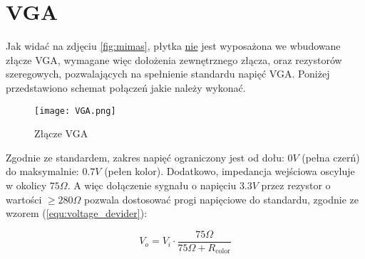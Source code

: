 \section{VGA}
    \tab Jak widać na zdjęciu \ref{fig:mimas}, płytka \underline{nie} jest wyposażona we wbudowane złącze VGA,
    wymagane więc dołożenia zewnętrznego złącza, oraz rezystorów szeregowych, 
    pozwalających na spełnienie standardu napięć VGA. Poniżej przedstawiono schemat połączeń jakie należy wykonać.

    \begin{figure}[!ht]
        \centering
        \texttt{[image: VGA.png]}
        \renewcommand{\figurename}{Schemat}
        \caption{Złącze VGA}
    \end{figure}

    Zgodnie ze standardem, zakres napięć ograniczony jest od dołu: $0V$ (pełna czerń) do maksymalnie: $0.7V$ (pełen kolor).
    Dodatkowo, impedancja wejściowa oscyluje w okolicy $75\Omega$. 
    A więc dołączenie sygnału o napięciu $3.3V$ przez rezystor o wartości $\ge 280\Omega$ pozwala dostosować progi napięciowe do standardu, zgodnie ze wzorem (\ref{equ:voltage_devider}):
    
    \begin{equation}
        V_o = V_i \cdot \frac{75\Omega}{75\Omega + R_{\text{color}}}
        \label{equ:voltage_devider}
    \end{equation}

